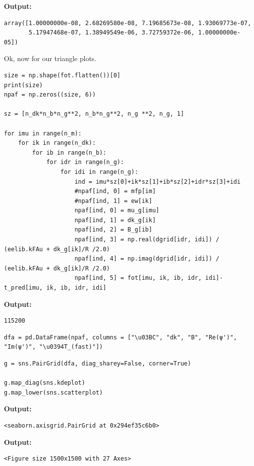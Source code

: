 \documentclass{article}
\begin{document}
\textbf{Output:}\begin{verbatim}
array([1.00000000e-08, 2.68269580e-08, 7.19685673e-08, 1.93069773e-07,
       5.17947468e-07, 1.38949549e-06, 3.72759372e-06, 1.00000000e-05])
\end{verbatim}

Ok, now for our triangle plots.

\begin{lstlisting}
size = np.shape(fot.flatten())[0]
print(size)
npaf = np.zeros((size, 6))

sz = [n_dk*n_b*n_g**2, n_b*n_g**2, n_g **2, n_g, 1]

for imu in range(n_m):
    for ik in range(n_dk):
        for ib in range(n_b):
            for idr in range(n_g):
                for idi in range(n_g):
                    ind = imu*sz[0]+ik*sz[1]+ib*sz[2]+idr*sz[3]+idi
                    #npaf[ind, 0] = mfp[im]
                    #npaf[ind, 1] = ew[ik]
                    npaf[ind, 0] = mu_g[imu]
                    npaf[ind, 1] = dk_g[ik]
                    npaf[ind, 2] = B_g[ib]
                    npaf[ind, 3] = np.real(dgrid[idr, idi]) / (eelib.kFAu + dk_g[ik]/R /2.0)
                    npaf[ind, 4] = np.imag(dgrid[idr, idi]) / (eelib.kFAu + dk_g[ik]/R /2.0)
                    npaf[ind, 5] = fot[imu, ik, ib, idr, idi]-t_pred[imu, ik, ib, idr, idi]\end{lstlisting}

\textbf{Output:}\begin{verbatim}
115200

\end{verbatim}

\begin{lstlisting}
dfa = pd.DataFrame(npaf, columns = ["\u03BC", "dk", "B", "Re(ψ')", "Im(ψ')", "\u0394T_(fast)"])\end{lstlisting}

\begin{lstlisting}
g = sns.PairGrid(dfa, diag_sharey=False, corner=True)

g.map_diag(sns.kdeplot)
g.map_lower(sns.scatterplot)\end{lstlisting}

\textbf{Output:}\begin{verbatim}
<seaborn.axisgrid.PairGrid at 0x294ef35c6b0>
\end{verbatim}

\textbf{Output:}\begin{verbatim}
<Figure size 1500x1500 with 27 Axes>
\end{verbatim}
\end{document}
